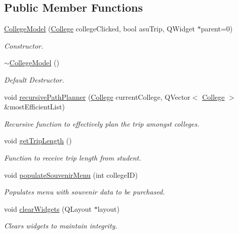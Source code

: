 \subsection*{Public Member Functions}
\begin{DoxyCompactItemize}
\item 
\mbox{\hyperlink{class_college_model_a028e4ea98b27a8d5fffafdb69a1d9e2d}{College\+Model}} (\mbox{\hyperlink{struct_college}{College}} college\+Clicked, bool asu\+Trip, Q\+Widget $\ast$parent=0)
\begin{DoxyCompactList}\small\item\em Constructor. \end{DoxyCompactList}\item 
\mbox{\hyperlink{class_college_model_a2edbda0635ecdd023e4d7ea8258f72e3}{$\sim$\+College\+Model}} ()
\begin{DoxyCompactList}\small\item\em Default Destructor. \end{DoxyCompactList}\item 
void \mbox{\hyperlink{class_college_model_a95322085a90304da8cbb265c80a3c3aa}{recursive\+Path\+Planner}} (\mbox{\hyperlink{struct_college}{College}} current\+College, Q\+Vector$<$ \mbox{\hyperlink{struct_college}{College}} $>$ \&most\+Efficient\+List)
\begin{DoxyCompactList}\small\item\em Recursive function to effectively plan the trip amongst colleges. \end{DoxyCompactList}\item 
void \mbox{\hyperlink{class_college_model_ab621eb530418fdcbd35a88911881504f}{get\+Trip\+Length}} ()
\begin{DoxyCompactList}\small\item\em Function to receive trip length from student. \end{DoxyCompactList}\item 
void \mbox{\hyperlink{class_college_model_aeabb600577c25bbe804849baa4875c14}{populate\+Souvenir\+Menu}} (int college\+ID)
\begin{DoxyCompactList}\small\item\em Populates menu with souvenir data to be purchased. \end{DoxyCompactList}\item 
void \mbox{\hyperlink{class_college_model_adad9674dbee23e82f64508cd1cfe2670}{clear\+Widgets}} (Q\+Layout $\ast$layout)
\begin{DoxyCompactList}\small\item\em Clears widgets to maintain integrity. \end{DoxyCompactList}\item 

\end{DoxyCompactItemize}

